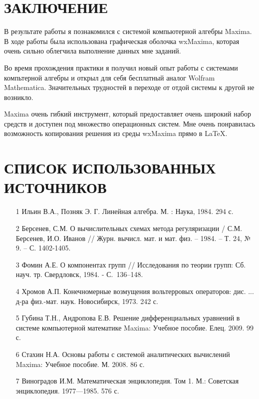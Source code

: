\documentclass[article, bachelor, och, pract]{SCWorks}
\begin{document}
\section*{ЗАКЛЮЧЕНИЕ}
В результате работы я познакомился с системой компьютерной алгебры Maxima. В ходе работы была использована графическая оболочка wxMaxima, которая очень сильно облегчила выполнение данных мне заданий.

Во время прохождения практики я получил новый опыт работы с системами компьтерной алгебры и открыл для себя бесплатный аналог Wolfram Mathematica. Значительных трудностей в переходе от отдой системы к другой не возникло. 

Maxima очень гибкий инструмент, который предоставляет очень широкий набор средств и доступен под множество операционных систем. Мне очень понравилась возможность копирования решения из среды wxMaxima прямо в \LaTeX. 

\section*{СПИСОК ИСПОЛЬЗОВАННЫХ ИСТОЧНИКОВ}
\begin{itemize}
\item[1] Ильин В.А., Позняк Э. Г. Линейная алгебра. М. : Наука, 1984. 294 с.
\item[2] Берсенев, С.М. О вычислительных схемах метода регуляризации / С.М. Берсенев, И.О. Иванов // Журн. вычисл. мат. и мат. физ. – 1984. – Т. 24, № 9. – С. 1402-1405. 
\item[3] Фомин А.Е. О компонентах групп // Исследования по теории групп: Сб. науч. тр. Свердловск, 1984. - С.~136--148.
\item[4] Хромов А.П. Конечномерные возмущения вольтерровых операторов: дис. ... д-ра физ.-мат. наук. Новосибирск, 1973. 242 с.
\item[5] Губина Т.Н., Андропова Е.В. Решение дифференциальных уравнений в системе компьютерной математике Maxima: Учебное пособие. Елец. 2009. 99 с.
\item[6] Стахин Н.А. Основы работы с системой аналитических вычислений Maxima: Учебное пособие. М. 2008. 86 с.
\item[7] Виноградов И.М. Математическая энциклопедия. Том 1. М.: Советская энциклопедия. 1977—1985. 576 с.
\end{itemize}
\end{document}
